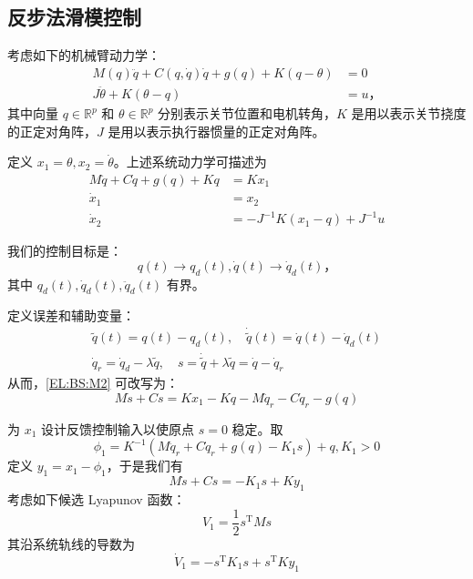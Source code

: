 \subsection{反步法滑模控制}\label{6Fref}

考虑如下的机械臂动力学：
\begin{align*}
    M(q) \ddot{q} + C(q, \dot{q}) \dot{q} + g(q) + K (q - \theta) & = 0 \\
    J \ddot{\theta} + K (\theta - q) & = u \text{，}
\end{align*}
其中向量 $q \in \mathbb{R}^p$ 和 $\theta \in \mathbb{R}^p$ 分别表示关节位置和电机转角，$K$ 是用以表示关节挠度的正定对角阵，$J$ 是用以表示执行器惯量的正定对角阵。

定义 $x_1 = \theta, x_2 = \dot{\theta}$。上述系统动力学可描述为
\begin{align}
    M \ddot{q} + C \dot{q} + g(q) + K q & = K x_1 \label{EL:BS:M2} \\
    \dot{x}_1 & = x_2 \nonumber \\
    \dot{x}_2 & = - J^{- 1} K (x_1 - q) + J^{- 1} u \nonumber
\end{align}

我们的控制目标是：
\[
    q (t) \rightarrow q_d (t), \dot{q} (t) \rightarrow \dot{q}_d (t) \text{，}
\]
其中 $q_d(t), \dot{q}_d(t), \ddot{q}_d(t)$ 有界。

定义误差和辅助变量：
\begin{gather*}
    \tilde{q} (t) = q (t) - q_d (t), \quad \dot{\tilde{q}} (t) = \dot{q} (t) - \dot{q}_d (t) \\
    \dot{q}_r = \dot{q}_d - \lambda \tilde{q}, \quad s = \dot{\tilde{q}} + \lambda \tilde{q} = \dot{q} - \dot{q}_r
\end{gather*}
从而，\eqref{EL:BS:M2} 可改写为：
\[
    M \dot{s} + C  s = K  x_1 - K  q - M \ddot{q}_r - C \dot{q}_r - g(q) 
\]


为  $x_1$ 设计反馈控制输入以使原点 $s=0$ 稳定。取
\[
    \phi_1 = K^{- 1} (M \ddot{q}_r + C \dot{q}_r + g(q) - K_1 s) + q, K_1  > 0
\]
定义 $y_1 = x_1 - \phi_1$，于是我们有
\begin{equation}
    M \dot{s} + C s = - K_1 s + K y_1 \label{EL:BS:M3}
\end{equation}
考虑如下候选 Lyapunov 函数：
\[
    V_1 = \dfrac{1}{2} s^\mathrm{T} M s
\]
其沿系统轨线的导数为
\[
    \dot{V}_1 = - s^\mathrm{T} K_1 s + s^\mathrm{T} K y_1
\]


